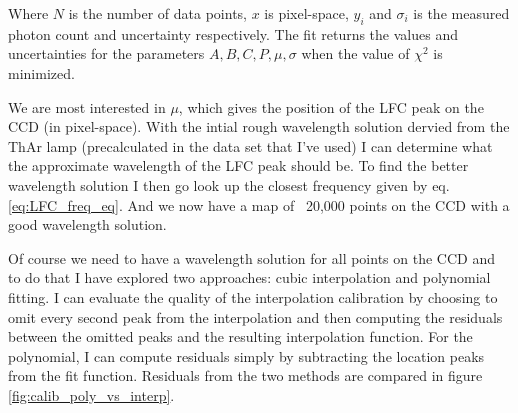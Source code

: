     Where $N$ is the number of data points, $x$ is pixel-space, $y_i$ and $\sigma_i$ is the measured photon count and uncertainty respectively. The fit returns the values and uncertainties for the parameters $A, B, C, P, \mu, \sigma$ when the value of $\chi^2$ is minimized.
    
    We are most interested in $\mu$, which gives the position of the LFC peak on the CCD (in pixel-space). With the intial rough wavelength solution dervied from the ThAr lamp (precalculated in the data set that I've used) I can determine what the approximate wavelength of the LFC peak should be. To find the better wavelength solution I then go look up the closest frequency given by eq. \ref{eq:LFC_freq_eq}. And we now have a map of ~20,000 points on the CCD with a good wavelength solution. 
    
    Of course we need to have a wavelength solution for all points on the CCD and to do that I have explored two approaches: cubic interpolation and polynomial fitting.  I can evaluate the quality of the interpolation calibration by choosing to omit every second peak from the interpolation and then computing the residuals between the omitted peaks and the resulting interpolation function. For the polynomial, I can compute residuals simply by subtracting the location peaks from the fit function. Residuals from the two methods are compared in figure \ref{fig:calib_poly_vs_interp}.


